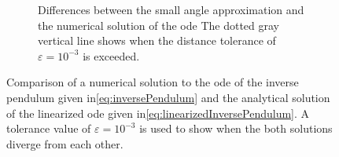 \begin{figure}
\begin{subfigure}[t]{0.5\linewidth}
					\caption{Differences between the small angle approximation and the numerical solution of the \ac{ode}  The dotted gray vertical line shows when the distance tolerance of \( \varepsilon = 10^{-3} \) is exceeded.}
				\end{subfigure}
				\caption{Comparison of a numerical solution to the \ac{ode} of the inverse pendulum given in\eqref{eq:inversePendulum} and the analytical solution of the linearized \ac{ode} given in\eqref{eq:linearizedInversePendulum}. A tolerance value of \( \varepsilon = 10^{-3} \) is used to show when the both solutions diverge from each other.}
				\label{fig:inversePendulumApprox}
			\end{figure}
